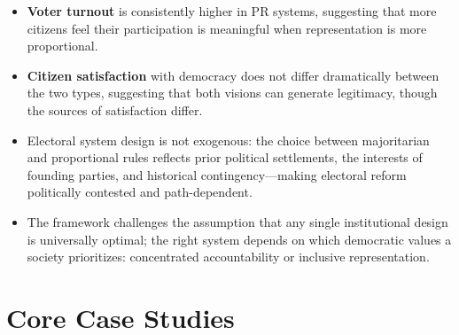 \documentclass[12pt]{article}
\begin{document}
\begin{itemize}[leftmargin=*, itemsep=4pt]
    \item \textbf{Voter turnout} is consistently higher in PR systems, suggesting that more citizens feel their participation is meaningful when representation is more proportional.
    \item \textbf{Citizen satisfaction} with democracy does not differ dramatically between the two types, suggesting that both visions can generate legitimacy, though the sources of satisfaction differ.
    \item Electoral system design is not exogenous: the choice between majoritarian and proportional rules reflects prior political settlements, the interests of founding parties, and historical contingency---making electoral reform politically contested and path-dependent.
    \item The framework challenges the assumption that any single institutional design is universally optimal; the right system depends on which democratic values a society prioritizes: concentrated accountability or inclusive representation.
\end{itemize}

\section{Core Case Studies}
\end{document}
